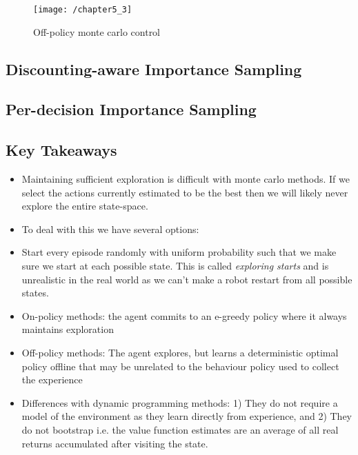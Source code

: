 \begin{figure}[h!]
	\centering
	\texttt{[image: /chapter5\_3]}
	\caption{Off-policy monte carlo control}
	\label{fig:Off-policy monte carlo control}
\end{figure}

\subsection{Discounting-aware Importance Sampling}


\subsection{Per-decision Importance Sampling}

\subsection{Key Takeaways}
\begin{itemize}
\item Maintaining sufficient exploration is difficult with monte carlo methods. If we select the actions currently estimated to be the best then we will likely never explore the entire state-space.
\item To deal with this we have several options:
\item Start every episode randomly with uniform probability such that we make sure we start at each possible state. This is called \textit{exploring starts} and is unrealistic in the real world as we can't make a robot restart from all possible states.
\item On-policy methods: the agent commits to an e-greedy policy where it always maintains exploration
\item Off-policy methods: The agent explores, but learns a deterministic optimal policy offline that may be unrelated to the behaviour policy used to collect the experience
\item Differences with dynamic programming methods: 1) They do not require a model of the environment as they learn directly from experience, and 2) They do not bootstrap i.e. the value function estimates are an average of all real returns accumulated after visiting the state.
\end{itemize}